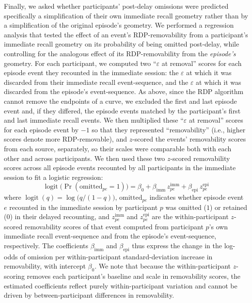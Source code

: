 \documentclass[10pt]{article}
\begin{document}
Finally, we asked whether participants' post-delay omissions were predicted specifically a simplification of their own immediate recall geometry rather than by a simplification of the original episode's geometry.
We performed a regression analysis that tested the effect of an event's RDP-removability from a participant's immediate recall geometry on its probability of being omitted post-delay, while controlling for the analogous effect of its RDP-removability from the \textit{episode's} geometry.
For each participant, we computed two ``$\varepsilon$ at removal'' scores for each episode event they recounted in the immediate session: the $\varepsilon$ at which it was discarded from their immediate recall event-sequence, and the $\varepsilon$ at which it was discarded from the episode's event-sequence.
As above, since the RDP algorithm cannot remove the endpoints of a curve, we excluded the first and last episode event and, if they differed, the episode events matched by the participant's first and last immediate recall events.
We then multiplied these ``$\varepsilon$ at removal'' scores for each episode event by $-1$ so that they represented ``removability'' (i.e., higher scores denote more RDP-removable), and $z$-scored the events' removability scores from each source, separately, so their scales were comparable both with each other and across participants.
We then used these two $z$-scored removability scores across all episode events recounted by all participants in the immediate session to fit a logistic regression:
\begin{equation}\label{eqn:regression}
  \operatorname{logit}\!\big(\Pr(\text{omitted}_{pe}=1)\big)
    = \beta_0 + \beta_{\text{imm}}\, z^{\text{imm}}_{pe} + \beta_{\text{epi}}\, z^{\text{epi}}_{pe}
\end{equation}
where $\operatorname{logit}(q) = \log\!\big(q/(1-q)\big)$, $\text{omitted}_{pe}$ indicates whether episode event $e$ recounted in the immediate session by participant $p$ was omitted ($1$) or retained ($0$) in their delayed recounting, and $z^{\text{imm}}_{pe}$ and $z^{\text{epi}}_{pe}$ are the within-participant $z$-scored removability scores of that event computed from participant $p$'s own immediate recall event-sequence and from the episode's event-sequence, respectively.
The coefficients $\beta_{\text{imm}}$ and $\beta_{\text{epi}}$ thus express the change in the log-odds of omission per within-participant standard-deviation increase in removability, with intercept $\beta_0$.
We note that because the within-participant $z$-scoring removes each participant's baseline and scale in removability scores, the estimated coefficients reflect purely within-participant variation and cannot be driven by between-participant differences in removability.
\end{document}
